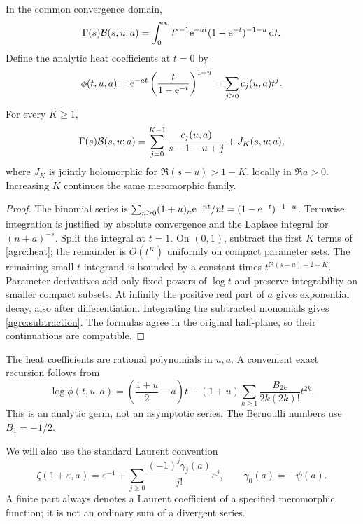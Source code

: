 \begin{lemma}
\label{agrc:mellin}
In the common convergence domain,
\begin{equation}\label{agrc:mellin-eq}
 \Gamma(s)\mathcal B(s,u;a)
 =\int_0^\infty t^{s-1}\mathrm e^{-at}(1-\mathrm e^{-t})^{-1-u}\,\mathrm d t.
\end{equation}
Define the analytic heat coefficients at $t=0$ by
\begin{equation}\label{agrc:heat}
 \phi(t,u,a)=\mathrm e^{-at}\left(\frac{t}{1-\mathrm e^{-t}}\right)^{1+u}
       =\sum_{j\geq0}c_j(u,a)t^j.
\end{equation}
For every $K\geq1$,
\begin{equation}\label{agrc:subtraction}
 \Gamma(s)\mathcal B(s,u;a)
  =\sum_{j=0}^{K-1}\frac{c_j(u,a)}{s-1-u+j}+J_K(s,u;a),
\end{equation}
where $J_K$ is jointly holomorphic for $\Re(s-u)>1-K$, locally in
$\Re a>0$. Increasing $K$ continues the same meromorphic family.
\end{lemma}
\begin{proof}
The binomial series is
$\sum_{n\geq0}(1+u)_n\mathrm e^{-nt}/n!=(1-\mathrm e^{-t})^{-1-u}$.
Termwise integration is justified by absolute convergence and the
Laplace integral for $(n+a)^{-s}$. Split the integral at $t=1$.
On $(0,1)$, subtract the first $K$ terms of \eqref{agrc:heat}; the
remainder is $O(t^K)$ uniformly on compact parameter sets.
The remaining small-$t$ integrand is bounded by a constant times
$t^{\Re(s-u)-2+K}$. Parameter derivatives add only fixed powers of
$\log t$ and preserve integrability on smaller compact subsets.
At infinity the positive real part of $a$ gives exponential decay,
also after differentiation. Integrating the subtracted monomials gives
\eqref{agrc:subtraction}. The formulas agree in the original half-plane,
so their continuations are compatible.
\end{proof}

The heat coefficients are rational polynomials in $u,a$. A convenient
exact recursion follows from
\begin{equation}\label{agrc:heat-log}
 \log\phi(t,u,a)=\left(\frac{1+u}{2}-a\right)t
 -(1+u)\sum_{k\geq1}\frac{B_{2k}}{2k(2k)!}t^{2k}.
\end{equation}
This is an analytic germ, not an asymptotic series. The Bernoulli
numbers use $B_1=-1/2$.

We will also use the standard Laurent convention
\begin{equation}\label{agrc:Stieltjes}
 \zeta(1+\varepsilon,a)=\varepsilon^{-1}
 +\sum_{j\geq0}\frac{(-1)^j\gamma_j(a)}{j!}\varepsilon^j,
 \qquad \gamma_0(a)=-\psi(a).
\end{equation}
A finite part always denotes a Laurent coefficient of a specified
meromorphic function; it is not an ordinary sum of a divergent series.

